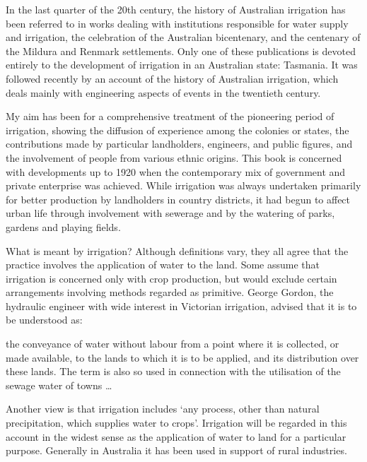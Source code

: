 In the last quarter of the 20th century, the history of Australian
irrigation has been referred to in works dealing with institutions
responsible for water supply and irrigation, the celebration of the
Australian bicentenary, and the centenary of the Mildura and Renmark
settlements.  Only one of these publications is devoted entirely to
the development of irrigation in an Australian state: Tasmania. It was
followed recently by an account of the history of Australian
irrigation, which deals mainly with engineering aspects of events in
the twentieth century.

My aim has been for a comprehensive treatment of the pioneering period
of irrigation, showing the diffusion of experience among the colonies
or states, the contributions made by particular landholders,
engineers, and public figures, and the involvement of people from
various ethnic origins.  This book is concerned with developments up
to 1920 when the contemporary mix of government and private enterprise
was achieved.  While irrigation was always undertaken primarily for
better production by landholders in country districts, it had begun to
affect urban life through involvement with sewerage and by the
watering of parks, gardens and playing fields.

What is meant by irrigation?  Although definitions vary, they all
agree that the practice involves the application of water to the land.
Some assume that irrigation is concerned only with crop production,
but would exclude certain arrangements involving methods regarded as
primitive.  George Gordon, the hydraulic engineer with wide interest
in Victorian irrigation, advised that it is to be understood as:
\begin{Quote}
	the conveyance of water without labour from a point where it
	is collected, or made available, to the lands to which it is
	to be applied, and its distribution over these lands. The term
	is also so used in connection with the utilisation of the
	sewage water of towns \ldots{}
\end{Quote}
Another view is that irrigation includes `any process, other than
natural precipitation, which supplies water to crops'.  Irrigation
will be regarded in this account in the widest sense as the
application of water to land for a particular purpose.  Generally in
Australia it has been used in support of rural
industries.


